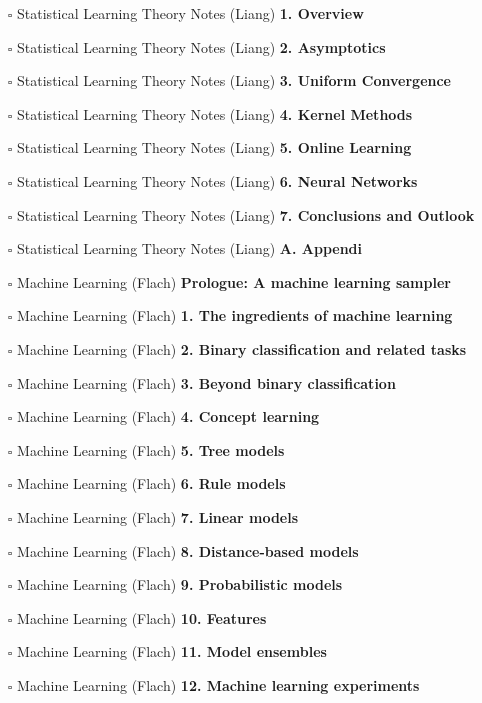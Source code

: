 \documentclass[a4, landscape, 12pt]{article}
\newcommand{\checkbox}{$\square$}%
\begin{document}
\begin{itemize}
\item [\checkbox]  Statistical Learning Theory Notes (Liang) \textbf{ 1. Overview
}
\item [\checkbox]  Statistical Learning Theory Notes (Liang) \textbf{ 2. Asymptotics
}
\item [\checkbox]  Statistical Learning Theory Notes (Liang) \textbf{ 3. Uniform Convergence
}
\item [\checkbox]  Statistical Learning Theory Notes (Liang) \textbf{ 4. Kernel Methods
}
\item [\checkbox]  Statistical Learning Theory Notes (Liang) \textbf{ 5. Online Learning
}
\item [\checkbox]  Statistical Learning Theory Notes (Liang) \textbf{ 6. Neural Networks
}
\item [\checkbox]  Statistical Learning Theory Notes (Liang) \textbf{ 7. Conclusions and Outlook
}
\item [\checkbox]  Statistical Learning Theory Notes (Liang) \textbf{ A. Appendi
}
\item [\checkbox]  Machine Learning (Flach) \textbf{ Prologue: A machine learning sampler
}
\item [\checkbox]  Machine Learning (Flach) \textbf{ 1. The ingredients of machine learning
}
\item [\checkbox]  Machine Learning (Flach) \textbf{ 2. Binary classification and related tasks
}
\item [\checkbox]  Machine Learning (Flach) \textbf{ 3. Beyond binary classification
}
\item [\checkbox]  Machine Learning (Flach) \textbf{ 4. Concept learning
}
\item [\checkbox]  Machine Learning (Flach) \textbf{ 5. Tree models
}
\item [\checkbox]  Machine Learning (Flach) \textbf{ 6. Rule models
}
\item [\checkbox]  Machine Learning (Flach) \textbf{ 7. Linear models
}
\item [\checkbox]  Machine Learning (Flach) \textbf{ 8. Distance-based models
}
\item [\checkbox]  Machine Learning (Flach) \textbf{ 9. Probabilistic models
}
\item [\checkbox]  Machine Learning (Flach) \textbf{ 10. Features
}
\item [\checkbox]  Machine Learning (Flach) \textbf{ 11. Model ensembles
}
\item [\checkbox]  Machine Learning (Flach) \textbf{ 12. Machine learning experiments
}
\end{itemize}
\end{document}
